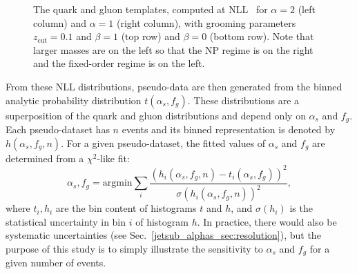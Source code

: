 \documentclass[11pt]{cernrep}
\begin{document}
\begin{figure}[t]
\caption{The quark and gluon templates, computed at NLL~\cite{Marzani:2017mva,Marzani:2017kqd} for $\alpha=2$ (left column) and 
  $\alpha=1$ (right column), with grooming parameters $z_{\mathrm{cut}}  = 0.1$ and $\beta = 1$ (top row) and $\beta = 0$ (bottom row).  Note that larger masses are on the left so that the NP regime is on the
  right and the fixed-order regime is on the left.}
\label{jetsub_alphas_fig:templates}
\end{figure}

From these NLL distributions, pseudo-data are then generated from the binned analytic probability distribution $t(\alpha_s,f_g)$.
%
These distributions are a superposition of the quark and gluon distributions and depend only on $\alpha_s$ and $f_g$.
%
Each pseudo-dataset has $n$ events and its binned representation is denoted by $h(\alpha_s,f_g,n)$.
%
For a given pseudo-dataset, the fitted values of $\alpha_s$ and $f_g$ are determined from a $\chi^2$-like fit:
%
\begin{equation}
\label{jetsub_alphas_eq:chi2fit}
\alpha_s,f_g=\mathrm{argmin} \sum_i \frac{\left(h_i(\alpha_s,f_g,n)-t_i(\alpha_s,f_g)\right)^2}{\sigma(h_i(\alpha_s,f_g,n))^2},
\end{equation}
%
where $t_i, h_i$ are the bin content of histograms $t$ and $h$, and $\sigma(h_i)$ is the statistical uncertainty in bin $i$ of histogram $h$.
%
In practice, there would also be systematic uncertainties (see Sec.~\ref{jetsub_alphas_sec:resolution}), but the purpose of this study is to simply illustrate the sensitivity to $\alpha_s$ and $f_g$ for a given number of events.
\end{document}
